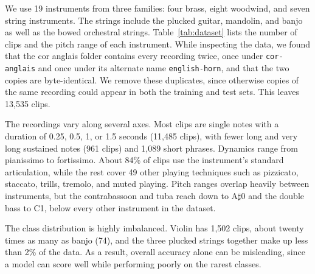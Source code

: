 \documentclass[11pt]{article}
\begin{document}
We use 19 instruments from three families: four brass, eight woodwind, and seven string instruments. The strings include the plucked guitar, mandolin, and banjo as well as the bowed orchestral strings. Table~\ref{tab:dataset} lists the number of clips and the pitch range of each instrument. While inspecting the data, we found that the cor anglais folder contains every recording twice, once under \texttt{cor-anglais} and once under its alternate name \texttt{english-horn}, and that the two copies are byte-identical. We remove these duplicates, since otherwise copies of the same recording could appear in both the training and test sets. This leaves 13,535 clips.

The recordings vary along several axes. Most clips are single notes with a duration of 0.25, 0.5, 1, or 1.5 seconds (11,485 clips), with fewer long and very long sustained notes (961 clips) and 1,089 short phrases. Dynamics range from pianissimo to fortissimo. About 84\% of clips use the instrument's standard articulation, while the rest cover 49 other playing techniques such as pizzicato, staccato, trills, tremolo, and muted playing. Pitch ranges overlap heavily between instruments, but the contrabassoon and tuba reach down to A$\sharp$0 and the double bass to C1, below every other instrument in the dataset.

The class distribution is highly imbalanced. Violin has 1,502 clips, about twenty times as many as banjo (74), and the three plucked strings together make up less than 2\% of the data. As a result, overall accuracy alone can be misleading, since a model can score well while performing poorly on the rarest classes.
\end{document}
